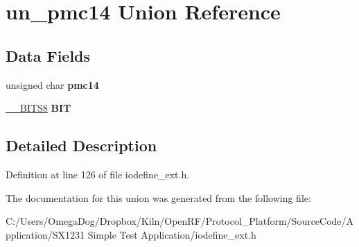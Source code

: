 \hypertarget{unionun__pmc14}{\section{un\-\_\-pmc14 Union Reference}
\label{unionun__pmc14}
}
\subsection*{Data Fields}
\begin{DoxyCompactItemize}
\item 
\hypertarget{unionun__pmc14_a457b1b45ac9a191d444d333e1f332313}{unsigned char {\bfseries pmc14}}\label{unionun__pmc14_a457b1b45ac9a191d444d333e1f332313}

\item 
\hypertarget{unionun__pmc14_a67d6d113ca075aac453148c65fc286a5}{\hyperlink{struct_____b_i_t_s8}{\-\_\-\-\_\-\-B\-I\-T\-S8} {\bfseries B\-I\-T}}\label{unionun__pmc14_a67d6d113ca075aac453148c65fc286a5}

\end{DoxyCompactItemize}


\subsection{Detailed Description}


Definition at line 126 of file iodefine\-\_\-ext.\-h.



The documentation for this union was generated from the following file\-:\begin{DoxyCompactItemize}
\item 
C\-:/\-Users/\-Omega\-Dog/\-Dropbox/\-Kiln/\-Open\-R\-F/\-Protocol\-\_\-\-Platform/\-Source\-Code/\-Application/\-S\-X1231 Simple Test Application/iodefine\-\_\-ext.\-h\end{DoxyCompactItemize}
